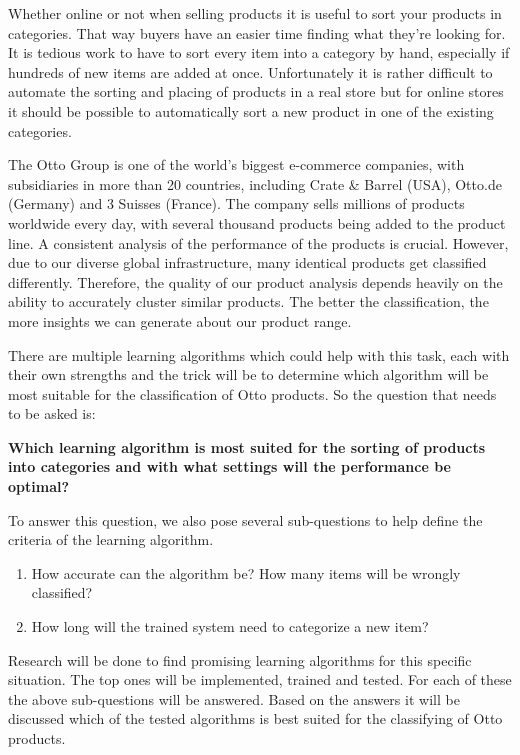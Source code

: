 Whether online or not when selling products it is useful to sort your products in categories. That way buyers have an easier time finding what they're looking for. It is tedious work to have to sort every item into a category by hand, especially if hundreds of new items are added at once. Unfortunately it is rather difficult to automate the sorting and placing of products in a real store but for online stores it should be possible to automatically sort a new product in one of the existing categories. 

The Otto Group is one of the world’s biggest e-commerce companies, with subsidiaries in more than 20 countries, including Crate \& Barrel (USA), Otto.de (Germany) and 3 Suisses (France). The company sells millions of products worldwide every day, with several thousand products being added to the product line. A consistent analysis of the performance of the products is crucial. However, due to our diverse global infrastructure, many identical products get classified differently. Therefore, the quality of our product analysis depends heavily on the ability to accurately cluster similar products. The better the classification, the more insights we can generate about our product range.

There are multiple learning algorithms which could help with this task, each with their own strengths and the trick will be to determine which algorithm will be most suitable for the classification of Otto products. So the question that needs to be asked is:
\begin{center}
\textbf{Which learning algorithm is most suited for the sorting of products into categories and with what settings will the performance be optimal?}
\end{center}
To answer this question, we also pose several sub-questions to help define the criteria of the learning algorithm.
\begin{center}
\begin{enumerate}
\item How accurate can the algorithm be? How many items will be wrongly classified?
\item How long will the trained system need to categorize a new item?
\end{enumerate}
\end{center}
Research will be done to find promising learning algorithms for this specific situation. The top ones will be implemented, trained and tested. For each of these the above sub-questions will be answered. Based on the answers it will be discussed which of the tested algorithms is best suited for the classifying of Otto products.